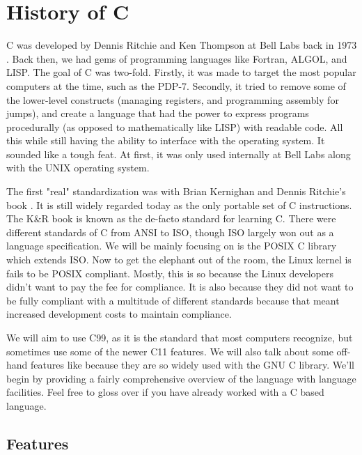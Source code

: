 \section{History of C}

C was developed by \gls{Dennis Ritchie} and \gls{Ken Thompson} at \gls{Bell Labs} back in 1973 \cite{Ritchie:1993:DCL:155360.155580}.
Back then, we had gems of programming languages like \gls{Fortran}, \gls{ALGOL}, and \gls{LISP}.
The goal of C was two-fold.
Firstly, it was made to target the most popular computers at the time, such as the \gls{PDP-7}.
Secondly, it tried to remove some of the lower-level constructs (managing \gls{registers}, and programming assembly for \gls{jumps}), and create a language that had the power to express programs procedurally (as opposed to mathematically like LISP) with readable code.
All this while still having the ability to interface with the operating system.
It sounded like a tough feat.
At first, it was only used internally at Bell Labs along with the UNIX operating system.

The first "real" standardization was with \gls{Brian Kernighan} and Dennis Ritchie's book \cite{kernighan1988c}.
It is still widely regarded today as the only \gls{portable} set of C instructions.
The K\&R book is known as the de-facto standard for learning C.
There were different standards of C from \gls{ANSI} to \gls{ISO}, though ISO largely won out as a language specification.
We will be mainly focusing on is the \gls{POSIX} C library which extends ISO.
Now to get the elephant out of the room, the \gls{Linux kernel} is fails to be POSIX compliant.
Mostly, this is so because the Linux developers didn't want to pay the fee for compliance.
It is also because they did not want to be fully compliant with a multitude of different standards because that meant increased development costs to maintain compliance.

We will aim to use C99, as it is the standard that most computers recognize, but sometimes use some of the newer C11 features.
We will also talk about some off-hand features like  because they are so widely used with the \gls{GNU C library}.
We'll begin by providing a fairly comprehensive overview of the language with language facilities.
Feel free to gloss over if you have already worked with a C based language.

\subsection{Features}

